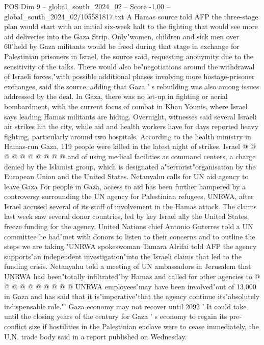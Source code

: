 \begin{textsample}{POS Dim 9 – global\_south\_2024\_02 – Score -1.00 – global\_south\_2024\_02/105581817.txt}  \label{ex:f9_pos_099}
A Hamas source told AFP the three-stage plan would start with an initial six-week halt to the fighting that would see more aid deliveries into the Gaza Strip.
Only"women, children and sick men over 60"held by Gaza militants would be freed during that stage in exchange for Palestinian prisoners in Israel, the source said, requesting anonymity due to the sensitivity of the talks.
There would also be"negotiations around the withdrawal of Israeli forces,"with possible additional phases involving more hostage-prisoner exchanges, said the source, adding that Gaza ' s rebuilding was also among issues addressed by the deal.
In Gaza, there was no let-up in fighting or aerial bombardment, with the current focus of combat in Khan Younis, where Israel says leading Hamas militants are hiding.
Overnight, witnesses said several Israeli air strikes hit the city, while aid and health workers have for days reported heavy fighting, particularly around two hospitals.
According to the health ministry in Hamas-run Gaza, 119 people were killed in the latest night of strikes.
Israel @ @ @ @ @ @ @ @ @ @ and of using medical facilities as command centers, a charge denied by the Islamist group, which is designated a"terrorist"organisation by the European Union and the United States.
Netanyahu calls for UN aid agency to leave Gaza For people in Gaza, access to aid has been further hampered by a controversy surrounding the UN agency for Palestinian refugees, UNRWA, after Israel accused several of its staff of involvement in the Hamas attack.
The claims last week saw several donor countries, led by key Israel ally the United States, freeze funding for the agency.
United Nations chief Antonio Guterres told a UN committee he had"met with donors to listen to their concerns and to outline the steps we are taking."UNRWA spokeswoman Tamara Alrifai told AFP the agency supports"an independent investigation"into the Israeli claims that led to the funding crisis.
Netanyahu told a meeting of UN ambassadors in Jerusalem that UNRWA had been"totally infiltrated"by Hamas and called for other agencies to @ @ @ @ @ @ @ @ @ @ UNRWA employees"may have been involved"out of 13,000 in Gaza and has said that it is"imperative"that the agency continue its"absolutely indispensable role."' Gaza economy may not recover until 2092 ' It could take until the closing years of the century for Gaza ' s economy to regain its pre-conflict size if hostilities in the Palestinian enclave were to cease immediately, the U.N. trade body said in a report published on Wednesday.

\end{textsample}
